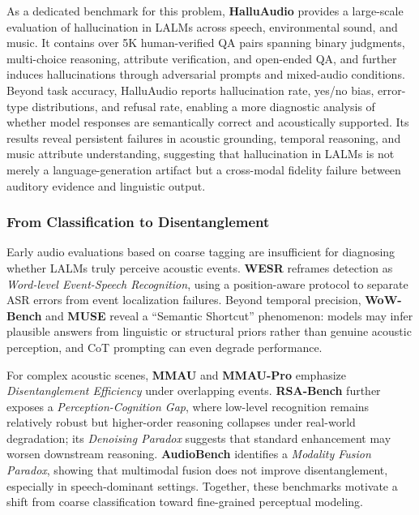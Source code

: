 \documentclass{llmxive}
\begin{document}
As a dedicated benchmark for this problem, \textbf{HalluAudio} \cite{zhao2026halluaudiocomprehensivebenchmarkhallucination} provides a large-scale evaluation of hallucination in LALMs across speech, environmental sound, and music. It contains over 5K human-verified QA pairs spanning binary judgments, multi-choice reasoning, attribute verification, and open-ended QA, and further induces hallucinations through adversarial prompts and mixed-audio conditions. Beyond task accuracy, HalluAudio reports hallucination rate, yes/no bias, error-type distributions, and refusal rate, enabling a more diagnostic analysis of whether model responses are semantically correct and acoustically supported. Its results reveal persistent failures in acoustic grounding, temporal reasoning, and music attribute understanding, suggesting that hallucination in LALMs is not merely a language-generation artifact but a cross-modal fidelity failure between auditory evidence and linguistic output.

\subsubsection{From Classification to Disentanglement}
\label{sec:5.1.1}
Early audio evaluations based on coarse tagging are insufficient for diagnosing whether LALMs truly perceive acoustic events. \textbf{WESR} \cite{yang2026wesr} reframes detection as \textit{Word-level Event-Speech Recognition}, using a position-aware protocol to separate ASR errors from event localization failures. Beyond temporal precision, \textbf{WoW-Bench} \cite{kim2025wow} and \textbf{MUSE} \cite{carone2025muse} reveal a ``Semantic Shortcut'' phenomenon: models may infer plausible answers from linguistic or structural priors rather than genuine acoustic perception, and CoT prompting can even degrade performance.

For complex acoustic scenes, \textbf{MMAU} \cite{sakshi2024mmau} and \textbf{MMAU-Pro} \cite{kumar2025mmau} emphasize \textit{Disentanglement Efficiency} under overlapping events. \textbf{RSA-Bench} \cite{zhang2026rsa} further exposes a \textit{Perception-Cognition Gap}, where low-level recognition remains relatively robust but higher-order reasoning collapses under real-world degradation; its \textit{Denoising Paradox} suggests that standard enhancement may worsen downstream reasoning. \textbf{AudioBench} \cite{wang2025audiobench} identifies a \textit{Modality Fusion Paradox}, showing that multimodal fusion does not improve disentanglement, especially in speech-dominant settings. Together, these benchmarks motivate a shift from coarse classification toward fine-grained perceptual modeling.
\end{document}
